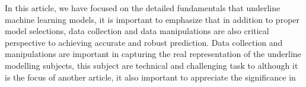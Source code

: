 
\par
In this article, we have focused on the detailed fundamentals that underline machine learning models, it is important to emphasize that in addition to proper model selections, data collection and data manipulations are also critical perspective to achieving accurate and robust prediction. Data collection and manipulations are important in capturing the real representation of the underline modelling subjects, this subject are technical and challenging task to   although it is the focus of another article, it also important to appreciate the significance in 
\par 
